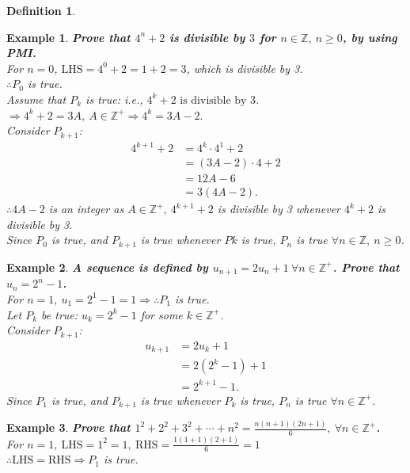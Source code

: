 \documentclass[12pt, a4paper]{article}
\newtheorem{definition}{Definition}[subsection]
\newtheorem{example}{Example}[subsection]
\begin{document}
\begin{enumerate}
\begin{definition}
  \end{definition}
  \begin{example}
    \textbf{Prove that $4^n+2$ is divisible by $3$ for $n \in \mathbb{Z},\ n\geq 0$, by using PMI.}\\
    For $n=0$, $\text{LHS}=4^0+2=1+2=3$, which is divisible by 3. \\
    $\therefore P_0$ {\color{green}{(OR denoted as $P(0)$)}} is true. \\
    Assume that $P_k$ is true: i.e., $4^k+2\text{ is divisible by }3$. $\Rightarrow 4^k+2=3A,\ A \in \mathbb{Z}^+ \Rightarrow 4^k=3A-2.$\\
    Consider $P_{k+1}$: 
    $$\begin{aligned}4^{k+1}+2&=4^k\cdot 4^1+2\\
      &=(3A-2)\cdot 4+2\\
      &=12A-6\\
      &=3(4A-2).
    \end{aligned}$$
    $\therefore 4A-2$ is an integer as $A \in \mathbb{Z}^+,\ 4^{k+1}+2$ is divisible by 3 whenever $4^k+2$ is divisible by 3. \\
    Since $P_0$ is true, and $P_{k+1}$ is true whenever $P{k}$ is true, $P_n$ is true $\forall n \in \mathbb{Z},\ n \geq 0$.
  \end{example}
  \begin{example}
    \textbf{A sequence is defined by $u_{n+1}=2u_n+1\ \forall n \in \mathbb{Z}^+$. Prove that $u_n=2^n-1$.}\\
    For $n=1,\ u_1=2^1-1=1\Rightarrow \therefore P_1$ is true.\\
    Let $P_k$ be true: $u_k=2^k-1$ for some $k\in\mathbb{Z}^+$.\\
    Consider $P_{k+1}$: 
    $$\begin{aligned}
      u_{k+1}&=2u_k+1\\
      &=2(2^k-1)+1\\
      &=2^{k+1}-1.
    \end{aligned}$$
    Since $P_1$ is true, and $P_{k+1}$ is true whenever $P_k$ is true, $P_n$ is true $\forall n\in\mathbb{Z}^+$.
  \end{example}
  \begin{example}
    \textbf{Prove that $1^2+2^2+3^2+\cdots+n^2=\frac{n(n+1)(2n+1)}{6},\ \forall n \in \mathbb{Z}^+$.}\\
    For $n=1,\ \text{LHS}=1^2=1,\ \text{RHS}=\frac{1(1+1)(2+1)}{6}=1$\\
    $\therefore \text{LHS}=\text{RHS} \Rightarrow P_1$ is true. \\

\end{example}
\end{enumerate}
\end{document}
